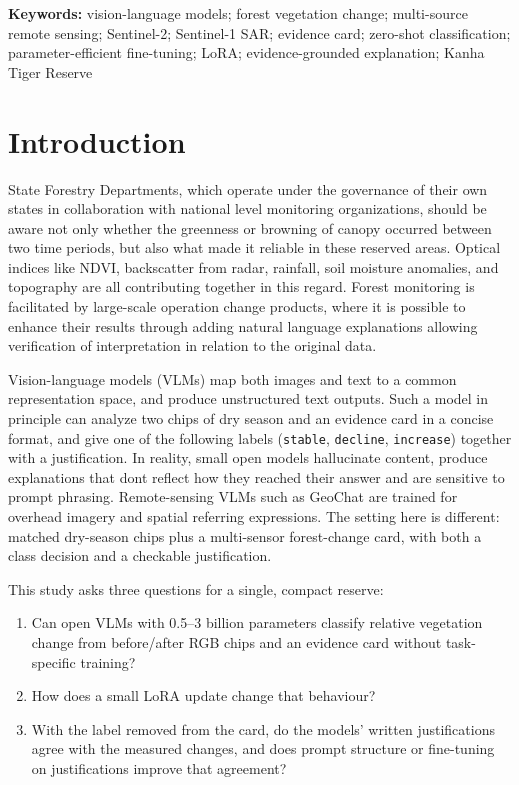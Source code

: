 \noindent
\textbf{Keywords:}
vision-language models;
forest vegetation change;
multi-source remote sensing;
Sentinel-2;
Sentinel-1 SAR;
evidence card;
zero-shot classification;
parameter-efficient fine-tuning;
LoRA;
evidence-grounded explanation;
Kanha Tiger Reserve


\section{Introduction}

State Forestry Departments, which operate under the governance of their own states in collaboration with national level monitoring organizations,
should be aware not only whether the greenness or browning of canopy occurred between
two time periods, but also what made it reliable in these reserved areas. Optical indices like NDVI, backscatter from radar, rainfall, soil moisture anomalies, and topography are all contributing together in this regard.
Forest monitoring is facilitated by large-scale operation change products, where it is possible to enhance their results through adding natural language explanations allowing verification of interpretation in relation to the original data.

Vision-language models (VLMs) map both images and text to a common representation space, and produce unstructured text outputs. Such a model in principle can analyze two chips of dry season and an evidence card in a concise format, and give one of the following labels
(\texttt{stable}, \texttt{decline}, \texttt{increase}) together with a
justification. In reality, small open models hallucinate content, produce explanations that dont reflect how they
reached their answer and are sensitive to
prompt phrasing. Remote-sensing VLMs such as GeoChat are trained for overhead imagery and spatial referring expressions. The setting here is different: matched dry-season chips plus a multi-sensor forest-change card, with both a class decision and a checkable justification.

This study asks three questions for a single, compact reserve:
\begin{enumerate}
\item Can open VLMs with 0.5--3 billion parameters classify relative
vegetation change from before/after RGB chips and an evidence card
without task-specific training?
\item How does a small LoRA update change that
behaviour?
\item With the label removed from the card, do the models' written
justifications agree with the measured changes, and does prompt
structure or fine-tuning on justifications improve that agreement?
\end{enumerate}


